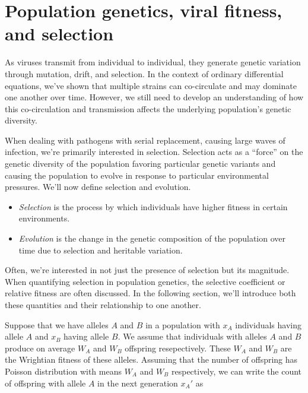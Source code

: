 
\section{Population genetics, viral fitness, and selection}

As viruses transmit from individual to individual, they generate genetic variation through mutation, drift, and selection.
In the context of ordinary differential equations, we've shown that multiple strains can co-circulate and may dominate one another over time.
However, we still need to develop an understanding of how this co-circulation and transmission affects the underlying population's genetic diversity.

When dealing with pathogens with serial replacement, causing large waves of infection, we're primarily interested in selection. 
Selection acts as a ``force'' on the genetic diversity of the population favoring particular genetic variants and causing the population to evolve in response to particular environmental pressures.
We'll now define selection and evolution.

\begin{itemize}
  \item \emph{Selection} is the process by which individuals have higher fitness in certain environments.
  \item \emph{Evolution} is the change in the genetic composition of the population over time due to selection and heritable variation.
\end{itemize}

Often, we’re interested in not just the presence of selection but its magnitude.
When quantifying selection in population genetics, the selective coefficient or relative fitness are often discussed. %
In the following section, we'll introduce both these quantities and their relationship to one another. 

Suppose that we have alleles $A$ and $B$ in a population with $x_A$ individuals having allele $A$ and $x_B$ having allele $B$. 
We assume that individuals with alleles $A$ and $B$ produce on average $W_A$ and $W_B$ offspring resepectively.
These $W_A$ and $W_B$ are the Wrightian fitness of these alleles.
Assuming that the number of offspring has Poisson distribution with means $W_A$ and $W_B$ respectively, we can write the count of offspring with allele $A$ in the next generation $x_A'$ as

